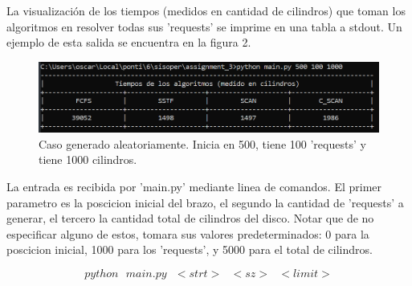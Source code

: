 \documentclass{article}
\theoremstyle{definition}
\begin{document}
	La visualización de los tiempos (medidos en cantidad de cilindros) que toman los algoritmos en resolver todas sus 'requests' se imprime en una tabla a stdout. Un ejemplo de esta salida se encuentra en la figura 2.
	
	\begin{figure}
		\includegraphics[width=1\linewidth]{tiempos_500_100_1000.png}
		\caption{Caso generado aleatoriamente. Inicia en 500, tiene 100 'requests' y tiene 1000 cilindros.}
	\end{figure}
	
	La entrada es recibida por 'main.py' mediante linea de comandos. El primer parametro es la poscicion inicial del brazo, el segundo la cantidad de 'requests' a generar, el tercero la cantidad total de cilindros del disco. Notar que de no especificar alguno de estos, tomara sus valores predeterminados: 0 para la poscicion inicial, 1000 para los 'requests', y 5000 para el total de cilindros.
	
	\[python \text{ } main.py \text{ } <strt> \text{ } <sz> \text{ } <limit>\]
	
\end{document}
